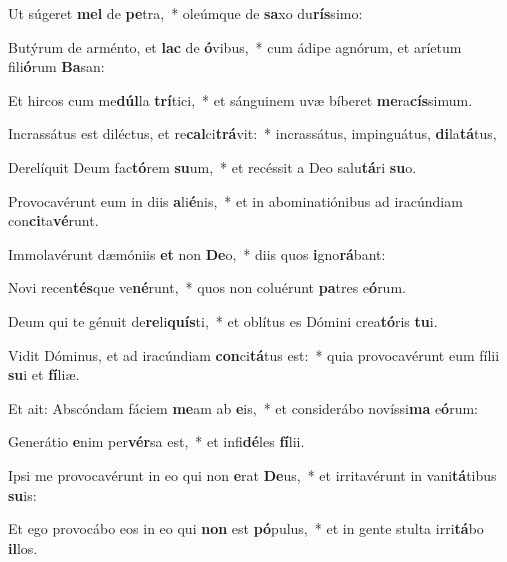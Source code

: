 \item Ut súgeret \textbf{mel} de \textbf{pe}tra,~* oleúmque de \textbf{sa}xo du\textbf{rís}simo:
\item Butýrum de arménto, et \textbf{lac} de \textbf{ó}vibus,~* cum ádipe agnórum, et aríetum fili\textbf{ó}rum \textbf{Ba}san:
\item Et hircos cum me\textbf{dúl}la \textbf{trí}tici,~* et sánguinem uvæ bíberet \textbf{me}ra\textbf{cís}simum.
\item Incrassátus est diléctus, et re\textbf{cal}ci\textbf{trá}vit:~* incrassátus, impinguátus, \textbf{di}la\textbf{tá}tus,
\item Derelíquit Deum fac\textbf{tó}rem \textbf{su}um,~* et recéssit a Deo salu\textbf{tá}ri \textbf{su}o.
\item Provocavérunt eum in diis \textbf{a}li\textbf{é}nis,~* et in abominatiónibus ad iracúndiam con\textbf{ci}ta\textbf{vé}runt.
\item Immolavérunt dæmóniis \textbf{et} non \textbf{De}o,~* diis quos \textbf{i}gno\textbf{rá}bant:
\item Novi recen\textbf{tés}que ve\textbf{né}runt,~* quos non coluérunt \textbf{pa}tres e\textbf{ó}rum.
\item Deum qui te génuit de\textbf{re}li\textbf{quís}ti,~* et oblítus es Dómini crea\textbf{tó}ris \textbf{tu}i.
\item Vidit Dóminus, et ad iracúndiam \textbf{con}ci\textbf{tá}tus est:~* quia provocavérunt eum fílii \textbf{su}i et \textbf{fí}liæ.
\item Et ait: Abscóndam fáciem \textbf{me}am ab \textbf{e}is,~* et considerábo novíssi\textbf{ma} e\textbf{ó}rum:
\item Generátio \textbf{e}nim per\textbf{vér}sa est,~* et infi\textbf{dé}les \textbf{fí}lii.
\item Ipsi me provocavérunt in eo qui non \textbf{e}rat \textbf{De}us,~* et irritavérunt in vani\textbf{tá}tibus \textbf{su}is:
\item Et ego provocábo eos in eo qui \textbf{non} est \textbf{pó}pulus,~* et in gente stulta irri\textbf{tá}bo \textbf{il}los.

